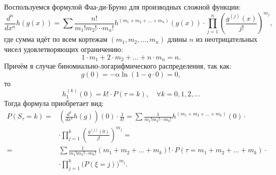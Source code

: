 \documentclass[12pt, specialist, subf, substylefile = spbu_report.rtx]{disser}
\begin{document}
	Воспользуемся формулой Фаа-ди-Бруно для производных сложной функции:
	\[ \frac {d ^n} {d x ^n} h(g(x)) = \sum \frac {n!} {m _1! m _2! \cdots m _n!} h ^{(m _1 + m _2 + \dots + m _n)} (g(x)) \cdot \prod \limits ^{n} _{j = 1} \left( \frac{g ^{(j)} (x)} {j!} \right) ^{m _j},\]
	где сумма идёт по всем кортежам $ (m _1, m _2, \dots, m _n) $ длины $ n $ из неотрицательных чисел удовлетворяющих ограничению:
	\[ 1 \cdot m _1 + 2 \cdot m _2 + \dots + n \cdot m _n = n. \]
	Причём в случае биномиально-логарифмического распределения, так как:
	\[ g(0) = - \alpha \ln (1 - q \cdot 0) = 0, \]
	то
	\[ h _1 ^{(k)} (0) = k! \cdot P(\tau = k), \quad \forall k = 0, 1, 2, \dots \]
	Тогда формула приобретает вид:
	\[ 
		\begin{aligned}
			P(S _\tau = k) =& \left(\frac {d ^k} {d x ^k} 	h(g)\right)(0) \cdot \frac 1 {k!} = \sum \frac 1 {m _1! m _2! \cdots m _k!} h ^{(m _1 + m _2 + \dots + m _k)} (0) \cdot\\
			&\cdot \prod \limits ^{k} _{j = 1} \left( \frac{g ^{(j)} (0)} {j!} \right) ^{m _j} =\\
			=& \sum \frac 1 {m _1! m _2! \cdots m _k!} (m _1 + m _2 + \dots + m _k)! \cdot P(\tau = m _1 + m _2 + \dots + m _k) \cdot\\
			&\cdot \prod \limits ^{k} _{j = 1} \big( P(\xi = j)  \big) ^{m _j}.
		\end{aligned}
	\]
	
\end{document}
